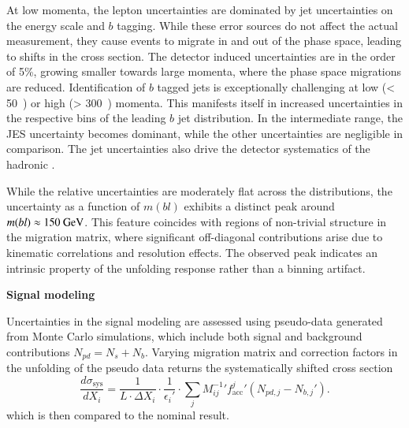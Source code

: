 At low momenta, the lepton \pt uncertainties are dominated by jet uncertainties on the energy scale and $b$ tagging. While these error sources do not affect the actual \pt measurement, they cause events to migrate in and out of the phase space, leading to shifts in the cross section.
The detector induced uncertainties are in the order of 5\%, growing smaller towards large momenta, where the phase space migrations are reduced.
Identification of $b$ tagged jets is exceptionally challenging at low (\pt < 50~\GeV) or high (\pt > 300~\GeV) momenta.
This manifests itself in increased uncertainties in the respective bins of the leading $b$ jet distribution.
In the intermediate range, the JES uncertainty becomes dominant, while the other uncertainties are negligible in comparison.
The jet uncertainties also drive the detector systematics of the hadronic \Wboson \pt.

While the relative uncertainties are moderately flat across the
\pt distributions, the uncertainty as a function of
$m(bl)$ exhibits a distinct peak around
$m(bl)\approx 150 ~\text{GeV}$. This feature coincides with regions of non-trivial structure in the migration matrix, where significant off-diagonal contributions arise due to kinematic correlations and resolution effects. The observed peak indicates an intrinsic property of the unfolding response rather than a binning artifact.

\vspace{.5cm}
\noindent
\textbf{Signal modeling}
\vspace{.5cm}

\noindent
Uncertainties in the signal modeling are assessed using pseudo-data generated from Monte Carlo simulations, which include both signal and background contributions $N_{pd} = N_s + N_b$.
Varying migration matrix and correction factors in the unfolding of the pseudo data returns the systematically shifted cross section
\begin{equation}
    \frac{d\sigma_\text{sys}}{dX_i} = \frac{1}{L\cdot \Delta X_i} \cdot \frac{1}{\epsilon_i'} \cdot \sum_j {M_{ij}^{-1}}'
    {f_{\text{acc}}^{j}}'(N_{pd,j}-N_{b,j}').
\end{equation}
which is then compared to the nominal result.

